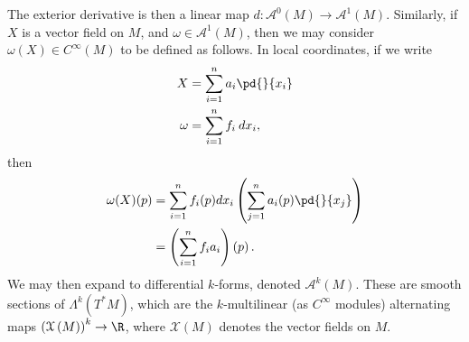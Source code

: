 \documentclass[10pt]{mypackage}
\begin{document}
The exterior derivative is then a linear map $d\colon \mathcal{A}^0\left( M \right)\rightarrow \mathcal{A}^1\left( M \right)$. Similarly, if $X$ is a vector field on $M$, and $ \omega \in \mathcal{A}^{1}\left( M \right) $, then we may consider $\omega\left( X \right)\in C^{\infty}\left( M \right)$ to be defined as follows. In local coordinates, if we write
\begin{align*}
  X &= \sum_{i=1}^{n} a_i \pd{}{x_i}\\
  \omega &= \sum_{i=1}^{n} f_i\:dx_i,
\end{align*}
then
\begin{align*}
  \omega(X)(p) &= \sum_{i=1}^{n}f_i(p)dx_i\left( \sum_{j=1}^{n} a_i(p) \pd{}{x_j} \right)\\
               &= \left( \sum_{i=1}^{n} f_ia_i \right)\left( p \right).
\end{align*}
We may then expand to differential $k$-forms, denoted $\mathcal{A}^{k}\left( M \right)$. These are smooth sections of $\Lambda^{k}\left( T^{\ast}M \right)$, which are the $k$-multilinear (as $C^{\infty}$ modules) alternating maps $\left( \mathcal{X}\left( M \right) \right)^{k}\rightarrow \R$, where $ \mathcal{X}\left( M \right) $ denotes the vector fields on $ M $.\newline
\end{document}
